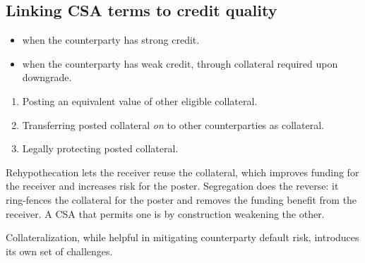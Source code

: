 \subsection*{Linking CSA terms to credit quality}

\begin{itemize}
\item {} when the counterparty has strong credit.
\item {} when the counterparty has weak credit, through
collateral required upon downgrade.
\end{itemize}


\begin{enumerate}[label=\alph*)]
\item {} Posting an equivalent value of other eligible
collateral.
\item {} Transferring posted collateral \emph{on} to other
counterparties as collateral.
\item {} Legally protecting posted collateral.
\end{enumerate}

\begin{crtrapbox}
Rehypothecation lets the receiver reuse the collateral, which improves funding for
the receiver and increases risk for the poster. Segregation does the reverse: it
ring-fences the collateral for the poster and removes the funding benefit from the
receiver. A CSA that permits one is by construction weakening the other.
\end{crtrapbox}


Collateralization, while helpful in mitigating counterparty default risk,
introduces its own set of challenges.

